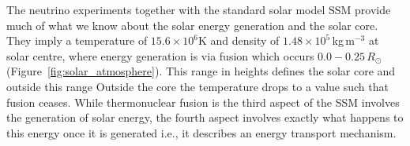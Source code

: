 The neutrino experiments together with the standard solar model SSM provide much of what we know about the solar energy generation and the solar core. They imply a temperature of $15.6\times10^6$K and density of $1.48\times10^5$\,kg\,m$^{-3}$ at solar centre, where energy generation is via fusion which occurs $0.0-0.25\,R_{\odot}$ (Figure~\ref{fig:solar_atmosphere}). This range in heights defines the solar core and outside this range Outside the core the temperature drops to a value such that fusion ceases. While thermonuclear fusion is the third aspect of the SSM involves the generation of solar energy, the fourth aspect involves exactly what happens to this energy once it is generated i.e., it describes an energy transport mechanism.


